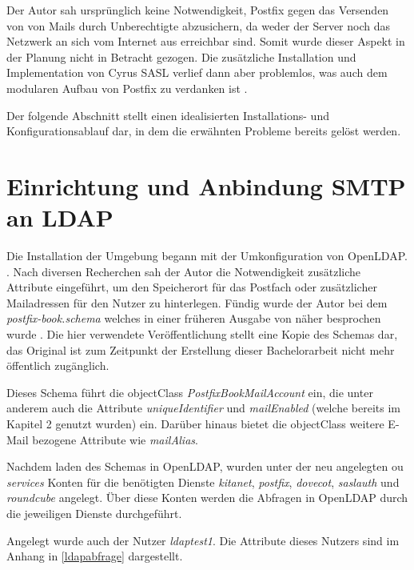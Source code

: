 Der Autor sah ursprünglich keine Notwendigkeit, Postfix gegen das Versenden von von Mails durch Unberechtigte abzusichern, da weder der Server noch das Netzwerk an sich vom Internet aus erreichbar sind. 
Somit wurde dieser Aspekt in der Planung nicht in Betracht gezogen. 
Die zusätzliche Installation und Implementation von Cyrus SASL verlief dann aber problemlos, was auch dem modularen Aufbau von Postfix zu verdanken ist \citep[zu Postfix und Cyrus SASL vgl][S. 210 ff.]{Heinlein2004}.

Der folgende Abschnitt stellt einen idealisierten Installations- und Konfigurationsablauf dar, in dem die erwähnten Probleme bereits gelöst werden.

\section{Einrichtung und Anbindung SMTP an LDAP}

Die Installation der Umgebung begann mit der Umkonfiguration von OpenLDAP.  \citep[][615]{Deimeke2019}. 
Nach diversen Recherchen sah der Autor die Notwendigkeit zusätzliche Attribute eingeführt, um den Speicherort für das Postfach oder zusätzlicher Mailadressen für den Nutzer zu hinterlegen. 
Fündig wurde der Autor bei dem \textit{postfix-book.schema} welches in einer früheren Ausgabe von \cite{Heinlein2004} näher besprochen wurde \citep[vgl.][]{pfschema}. Die hier verwendete Veröffentlichung stellt eine Kopie des Schemas dar, das Original ist zum Zeitpunkt der Erstellung dieser Bachelorarbeit nicht mehr öffentlich zugänglich.

Dieses Schema führt die objectClass \textit{PostfixBookMailAccount} ein, die unter anderem auch die Attribute \textit{uniqueIdentifier} und \textit{mailEnabled} (welche bereits im Kapitel 2 genutzt wurden) ein. Darüber hinaus bietet die objectClass weitere E-Mail bezogene Attribute wie \zb \textit{mailAlias}.  

Nachdem laden des Schemas in OpenLDAP, wurden unter der neu angelegten \ac{ou} \textit{services} Konten für die benötigten Dienste \textit{kitanet}, \textit{postfix}, \textit{dovecot}, \textit{saslauth} und \textit{roundcube} angelegt. 
Über diese Konten werden die Abfragen in OpenLDAP durch die jeweiligen Dienste durchgeführt. 

Angelegt wurde auch der Nutzer \textit{ldaptest1}. Die Attribute dieses Nutzers sind im Anhang in \autoref{ldapabfrage} dargestellt.

